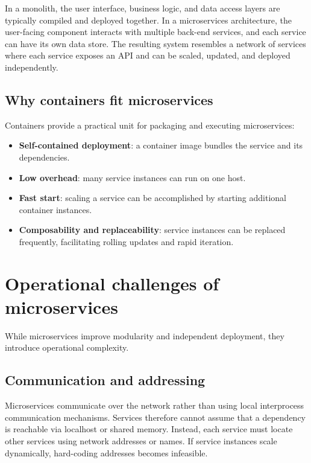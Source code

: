 \documentclass[11pt,a4paper,openany]{report}
\begin{document}
In a monolith, the user interface, business logic, and data access layers are typically compiled and deployed together. In a microservices architecture, the user-facing component interacts with multiple back-end services, and each service can have its own data store. The resulting system resembles a network of services where each service exposes an API and can be scaled, updated, and deployed independently.

\subsection{Why containers fit microservices}

Containers provide a practical unit for packaging and executing microservices:

\begin{itemize}
\item \textbf{Self-contained deployment}: a container image bundles the service and its dependencies.
\item \textbf{Low overhead}: many service instances can run on one host.
\item \textbf{Fast start}: scaling a service can be accomplished by starting additional container instances.
\item \textbf{Composability and replaceability}: service instances can be replaced frequently, facilitating rolling updates and rapid iteration.
\end{itemize}

\section{Operational challenges of microservices}

While microservices improve modularity and independent deployment, they introduce operational complexity.

\subsection{Communication and addressing}

Microservices communicate over the network rather than using local interprocess communication mechanisms. Services therefore cannot assume that a dependency is reachable via localhost or shared memory. Instead, each service must locate other services using network addresses or names. If service instances scale dynamically, hard-coding addresses becomes infeasible.
\end{document}
